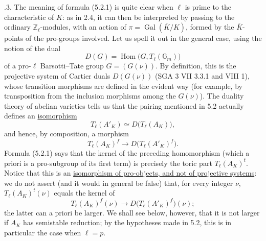 \smallskip
{}.3. The meaning of formula (5.2.1) is quite clear when $\ell$ is
prime to the characteristic of $K$: as in 2.4, it can then be
interpreted by passing to the ordinary $\mathbb Z_\ell$-modules, with
an action of
$\pi=\operatorname{Gal}(\overline K/K)$, formed by the
$\overline K$-points of the pro-groups involved.  Let us spell it out
in the general case, using the notion of the dual
\begin{equation}\tag{5.2.3.1}
 D(G)=\operatorname{Hom}\bigl(G,T_\ell(\mathbb G_m)\bigr)
\end{equation}
of a pro-$\ell$ Barsotti--Tate group $G=(G(\nu))$.  By definition,
this is the projective system of Cartier duals $D(G(\nu))$
(SGA 3 VII 3.3.1 and VIII 1), whose transition morphisms are defined in
the evident way (for example, by transposition from the inclusion
morphisms among the $G(\nu)$).  The duality theory of abelian
varieties tells us that the pairing mentioned in 5.2 actually defines
an \underline{isomorphism}
\begin{equation}\tag{5.2.3.2}
 T_\ell(A'_K)\simeq D\bigl(T_\ell(A_K)\bigr),
\end{equation}
and hence, by composition, a morphism
\begin{equation}\tag{5.2.3.3}
 T_\ell(A_K)^f\longrightarrow D\bigl(T_\ell(A'_K)^f\bigr).
\end{equation}
Formula (5.2.1) says that the kernel of the preceding homomorphism
(which a priori is a pro-subgroup of its first term) is precisely the
toric part $T_\ell(A_K)^t$.  Notice that this is an
\underline{isomorphism of pro-objects, and not of projective systems}:
we do not assert (and it would in general be false) that, for every
integer $\nu$, $T_\ell(A_K)^t(\nu)$ equals the kernel of
\[
 T_\ell(A_K)^f(\nu)
 \longrightarrow
 D\bigl(T_\ell(A'_K)^f\bigr)(\nu);
\]
the latter can a priori be larger.  We shall see below, however, that
it is not larger if $A_K$ has semistable reduction; by the hypotheses
made in 5.2, this is in particular the case when $\ell=p$.

